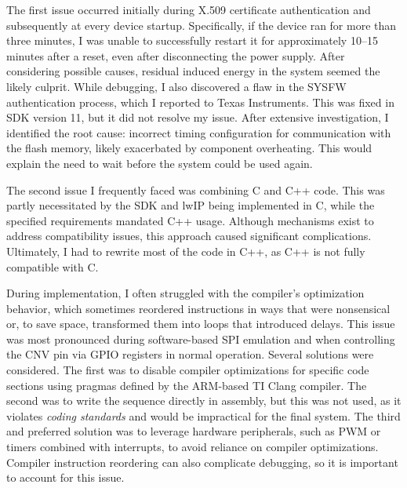 The first issue occurred initially during X.509 certificate authentication and subsequently at every device startup. Specifically, if the device ran for more than three minutes, I was unable to successfully restart it for approximately 10–15 minutes after a reset, even after disconnecting the power supply. After considering possible causes, residual induced energy in the system seemed the likely culprit. While debugging, I also discovered a flaw in the SYSFW authentication process, which I reported to Texas Instruments. This was fixed in SDK version 11, but it did not resolve my issue. After extensive investigation, I identified the root cause: incorrect timing configuration for communication with the flash memory, likely exacerbated by component overheating. This would explain the need to wait before the system could be used again.

The second issue I frequently faced was combining C and C++ code. This was partly necessitated by the SDK and lwIP being implemented in C, while the specified requirements mandated C++ usage. Although mechanisms exist to address compatibility issues, this approach caused significant complications. Ultimately, I had to rewrite most of the code in C++, as C++ is not fully compatible with C.

During implementation, I often struggled with the compiler’s optimization behavior, which sometimes reordered instructions in ways that were nonsensical or, to save space, transformed them into loops that introduced delays. This issue was most pronounced during software-based SPI emulation and when controlling the CNV pin via GPIO registers in normal operation. Several solutions were considered. The first was to disable compiler optimizations for specific code sections using pragmas defined by the ARM-based TI Clang compiler. The second was to write the sequence directly in assembly, but this was not used, as it violates {\it coding standards} and would be impractical for the final system. The third and preferred solution was to leverage hardware peripherals, such as PWM or timers combined with interrupts, to avoid reliance on compiler optimizations. Compiler instruction reordering can also complicate debugging, so it is important to account for this issue.

